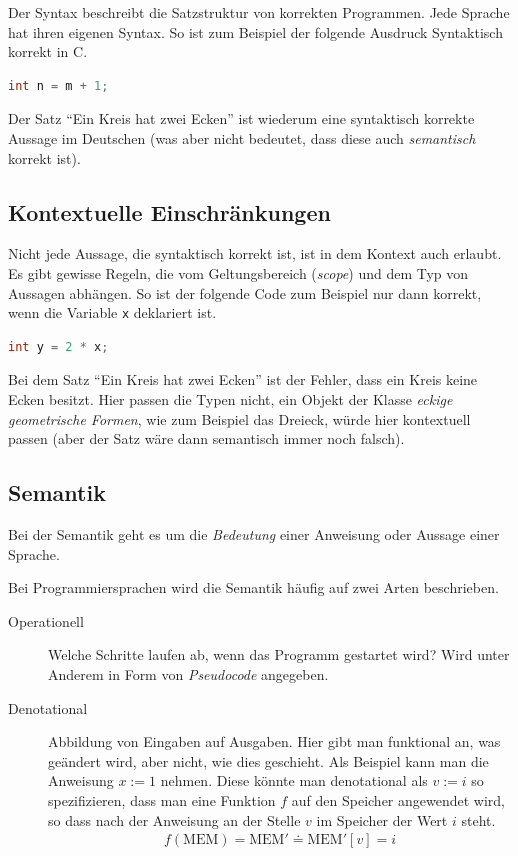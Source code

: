 \documentclass[
  ngerman,
  DIV=12
]{scrartcl}
\begin{document}
Der Syntax beschreibt die Satzstruktur von korrekten Programmen. Jede Sprache hat ihren eigenen Syntax. So ist zum Beispiel der folgende Ausdruck Syntaktisch korrekt in C.
\begin{lstlisting}[language=C]
int n = m + 1;
\end{lstlisting}
Der Satz \enquote{Ein Kreis hat zwei Ecken} ist wiederum eine syntaktisch korrekte Aussage im Deutschen (was aber nicht bedeutet, dass diese auch \emph{semantisch} korrekt ist).

\subsection{Kontextuelle Einschränkungen}

Nicht jede Aussage, die syntaktisch korrekt ist, ist in dem Kontext auch erlaubt. Es gibt gewisse Regeln, die vom Geltungsbereich (\emph{scope}) und dem Typ von Aussagen abhängen. So ist der folgende Code zum Beispiel nur dann korrekt, wenn die Variable \verb|x| deklariert ist.
\begin{lstlisting}[language=C]
int y = 2 * x;
\end{lstlisting}
Bei dem Satz \enquote{Ein Kreis hat zwei Ecken} ist der Fehler, dass ein Kreis keine Ecken besitzt. Hier passen die Typen nicht, ein Objekt der Klasse \emph{eckige geometrische Formen}, wie zum Beispiel das Dreieck, würde hier kontextuell passen (aber der Satz wäre dann semantisch immer noch falsch).

\subsection{Semantik}

Bei der Semantik geht es um die \emph{Bedeutung} einer Anweisung oder Aussage einer Sprache. 

Bei Programmiersprachen wird die Semantik häufig auf zwei Arten beschrieben. 

\begin{description}
\item[Operationell] Welche Schritte laufen ab, wenn das Programm gestartet wird? Wird unter Anderem in Form von \emph{Pseudocode} angegeben.
\item[Denotational] Abbildung von Eingaben auf Ausgaben. Hier gibt man funktional an, was geändert wird, aber nicht, wie dies geschieht. Als Beispiel kann man die Anweisung $ x := 1$ nehmen. Diese könnte man denotational als $v := i$ so spezifizieren, dass man eine Funktion $f$ auf den Speicher angewendet wird, so dass nach der Anweisung an der Stelle $v$ im Speicher der Wert $i$ steht.
\begin{align*}
  f(\mathrm{MEM}) = \mathrm{MEM'} \doteq \mathrm{MEM'}[v] = i
\end{align*}
\end{description}
\end{document}
